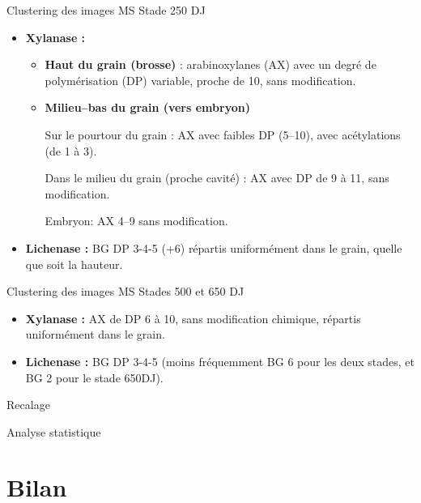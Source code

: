 \documentclass[10pt]{beamer}
\begin{document}
\begin{frame}{Clustering des images MS}
  Stade 250 DJ
  \begin{itemize}
  \item \textbf{Xylanase :}
    \begin{itemize}
    \item \textbf{Haut du grain (brosse) }: arabinoxylanes (AX) avec un degré de polymérisation (DP) variable, proche de 10, sans modification.
    \item \textbf{Milieu--bas du grain (vers embryon)}
      
      Sur le pourtour du grain : AX avec faibles DP (5--10), avec acétylations (de 1 à 3).
      
      Dans le milieu du grain (proche cavité) : AX avec DP de 9 à 11,
      sans modification.
      
      Embryon: AX 4--9 sans modification.
    \end{itemize}
  \item \textbf{Lichenase :} BG DP 3-4-5 (+6) répartis uniformément
    dans le grain, quelle que soit la hauteur.

  \end{itemize}


\end{frame}


\begin{frame}{Clustering des images MS}
  Stades 500 et 650 DJ
  \begin{itemize}
  \item \textbf{Xylanase :} AX de DP 6 à 10, sans modification chimique, répartis uniformément dans le grain.
  \item \textbf{Lichenase :} BG DP 3-4-5  (moins fréquemment BG 6 pour les deux stades, et BG 2 pour le stade 650DJ).
  \end{itemize}

\end{frame}

\begin{frame}{Recalage}

\end{frame}

\begin{frame}{Analyse statistique}

\end{frame}





\section{Bilan}
\end{document}
